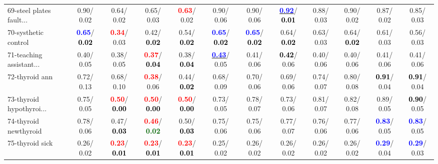 \begin{table}[h]
\begin{center}
{\begin{tabular}{lc|c|c|c|c|c|c|c|c|c|c}
69-steel plates fault... &   0.90/  0.02 &   0.64/  0.02 &   0.65/  0.03 & \textcolor{red}{\textbf{  0.63}}/  0.02 &   0.90/  0.06 &   0.90/  0.06 & \underline{\textcolor{blue}{\textbf{  0.92}}}/\textcolor{black}{\textbf{  0.01}} &   0.88/  0.03 &   0.90/  0.02 &   0.87/  0.02 &   0.85/  0.03 \\
70-systhetic control & \textcolor{blue}{\textbf{  0.65}}/\textcolor{black}{\textbf{  0.02}} & \textcolor{red}{\textbf{  0.34}}/  0.03 &   0.42/\textcolor{black}{\textbf{  0.02}} &   0.54/\textcolor{black}{\textbf{  0.02}} & \textcolor{blue}{\textbf{  0.65}}/\textcolor{black}{\textbf{  0.02}} & \textcolor{blue}{\textbf{  0.65}}/\textcolor{black}{\textbf{  0.02}} &   0.64/\textcolor{black}{\textbf{  0.02}} &   0.63/  0.03 &   0.64/\textcolor{black}{\textbf{  0.02}} &   0.61/  0.03 &   0.56/  0.03 \\
71-teaching assistant... &   0.40/  0.05 &   0.38/  0.05 & \textcolor{red}{\textbf{  0.37}}/\textcolor{black}{\textbf{  0.04}} &   0.38/\textcolor{black}{\textbf{  0.04}} & \underline{\textcolor{blue}{\textbf{  0.43}}}/  0.05 &   0.41/  0.06 & \textcolor{black}{\textbf{  0.42}}/  0.06 &   0.40/  0.06 &   0.40/  0.06 &   0.41/  0.06 &   0.41/  0.06 \\ \hline
72-thyroid ann &   0.72/  0.13 &   0.68/  0.10 & \textcolor{red}{\textbf{  0.38}}/  0.06 &   0.44/\textcolor{black}{\textbf{  0.02}} &   0.68/  0.09 &   0.70/  0.06 &   0.69/  0.06 &   0.74/  0.07 &   0.80/  0.08 & \textcolor{black}{\textbf{  0.91}}/  0.04 & \textcolor{black}{\textbf{  0.91}}/  0.04 \\
73-thyroid hypothyroi... &   0.75/  0.05 & \textcolor{red}{\textbf{  0.50}}/\textcolor{black}{\textbf{  0.00}} & \textcolor{red}{\textbf{  0.50}}/\textcolor{black}{\textbf{  0.00}} & \textcolor{red}{\textbf{  0.50}}/\textcolor{black}{\textbf{  0.00}} &   0.73/  0.05 &   0.78/  0.07 &   0.73/  0.06 &   0.81/  0.07 &   0.82/  0.08 &   0.89/  0.05 & \textcolor{black}{\textbf{  0.90}}/  0.05 \\
74-thyroid newthyroid &   0.78/  0.06 &   0.47/\textcolor{black}{\textbf{  0.03}} & \textcolor{red}{\textbf{  0.46}}/\textcolor{darkgreen}{\textbf{  0.02}} &   0.50/\textcolor{black}{\textbf{  0.03}} &   0.75/  0.06 &   0.75/  0.06 &   0.77/  0.07 &   0.76/  0.06 &   0.77/  0.06 & \textcolor{blue}{\textbf{  0.83}}/  0.05 & \textcolor{blue}{\textbf{  0.83}}/  0.05 \\
75-thyroid sick &   0.26/  0.02 & \textcolor{red}{\textbf{  0.23}}/\textcolor{black}{\textbf{  0.01}} & \textcolor{red}{\textbf{  0.23}}/\textcolor{black}{\textbf{  0.01}} & \textcolor{red}{\textbf{  0.23}}/\textcolor{black}{\textbf{  0.01}} &   0.25/  0.02 &   0.26/  0.02 &   0.26/  0.02 &   0.26/  0.02 &   0.26/  0.02 & \textcolor{blue}{\textbf{  0.29}}/  0.04 & \textcolor{blue}{\textbf{  0.29}}/  0.03 \\

\end{tabular}}
\end{center}
\end{table}
